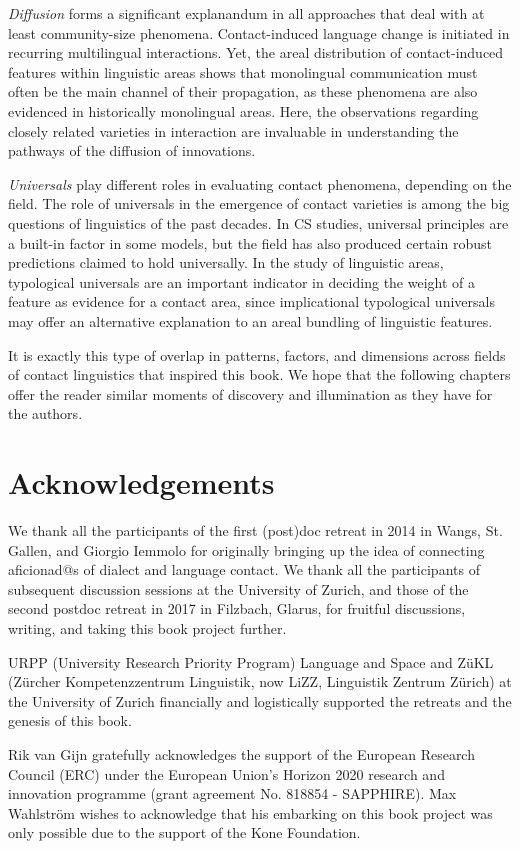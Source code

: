 \documentclass[output=paper]{langscibook}
\begin{document}
\textit{Diffusion} forms a significant explanandum in all approaches that deal with at least community-size phenomena. Contact-induced language change is initiated in recurring multilingual interactions. Yet, the areal distribution of contact-induced features within linguistic areas shows that monolingual communication must often be the main channel of their propagation, as these phenomena are also evidenced in historically monolingual areas. Here, the observations regarding closely related varieties in interaction are invaluable in understanding the pathways of the diffusion of innovations.

\textit{Universals} play different roles in evaluating contact phenomena, depending on the field. The role of universals in the emergence of contact varieties is among the big questions of linguistics of the past decades. In CS studies, universal principles are a built-in factor in some models, but the field has also produced certain robust predictions claimed to hold universally. In the study of linguistic areas, typological universals are an important indicator in deciding the weight of a feature as evidence for a contact area, since implicational typological universals may offer an alternative explanation to an areal bundling of linguistic features.

It is exactly this type of overlap in patterns, factors, and dimensions across fields of contact linguistics that inspired this book. We hope that the following chapters offer the reader similar moments of discovery and illumination as they have for the authors.

\section*{Acknowledgements}

We thank all the participants of the first (post)doc retreat in 2014 in Wangs, St. Gallen, and Giorgio Iemmolo for originally bringing up the idea of connecting aficionad@s of dialect and language contact. We thank all the participants of subsequent discussion sessions at the University of Zurich, and those of the second postdoc retreat in 2017 in Filzbach, Glarus, for fruitful discussions, writing, and taking this book project further.

URPP (University Research Priority Program) Language and Space and ZüKL (Zürcher Kompetenzzentrum Linguistik, now LiZZ, Linguistik Zentrum Zürich) at the University of Zurich financially and logistically supported the retreats and the genesis of this book. 

Rik van Gijn gratefully acknowledges the support of the European Research Council (ERC) under the European Union’s Horizon 2020 research and innovation programme (grant agreement No. 818854 - SAPPHIRE). Max Wahlström wishes to acknowledge that his embarking on this book project was only possible due to the support of the Kone Foundation.



\printbibliography[heading=subbibliography,notkeyword=this]
\end{document}
